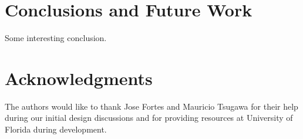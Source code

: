 \documentclass{acm_proc_article-sp}
\begin{document}
\section{Conclusions and Future Work}
\label{Sec:Conclusions}

Some interesting conclusion.

\section{Acknowledgments}

The authors would like to thank Jose Fortes and Mauricio Tsugawa for their help during our initial design discussions and for providing resources at University of Florida during development.


  
\end{document}
